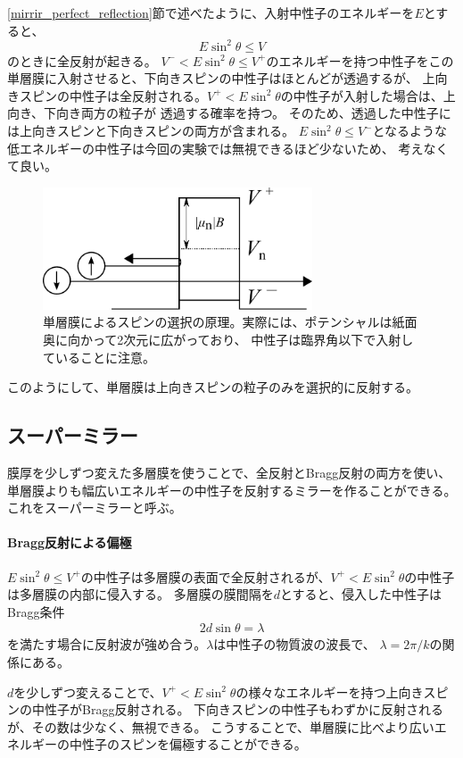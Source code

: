 \ref{mirrir_perfect_reflection}節で述べたように、入射中性子のエネルギーを$E$とすると、
\[
E\sin^2\theta\leq V
\]
のときに全反射が起きる。
$V^-< E\sin^2\theta\leq V^+$のエネルギーを持つ中性子をこの単層膜に入射させると、下向きスピンの中性子はほとんどが透過するが、
上向きスピンの中性子は全反射される。$V^+<E\sin^2\theta$の中性子が入射した場合は、上向き、下向き両方の粒子が
透過する確率を持つ。
そのため、透過した中性子には上向きスピンと下向きスピンの両方が含まれる。
$E\sin^2\theta\leq V^-$となるような低エネルギーの中性子は今回の実験では無視できるほど少ないため、
考えなくて良い。
\begin{figure}[h]
\centering
\includegraphics[width=8cm]{mirror/mono_mirror.pdf}
\caption{単層膜によるスピンの選択の原理。実際には、ポテンシャルは紙面奥に向かって2次元に広がっており、
中性子は臨界角以下で入射していることに注意。}
\end{figure}
このようにして、単層膜は上向きスピンの粒子のみを選択的に反射する。


\subsection{スーパーミラー}
膜厚を少しずつ変えた多層膜を使うことで、全反射とBragg反射の両方を使い、
単層膜よりも幅広いエネルギーの中性子を反射するミラーを作ることができる。
これをスーパーミラーと呼ぶ。

\paragraph{Bragg反射による偏極}
$E\sin^2\theta\leq V^+$の中性子は多層膜の表面で全反射されるが、$V^+<E\sin^2\theta$の中性子は多層膜の内部に侵入する。
多層膜の膜間隔を$d$とすると、侵入した中性子はBragg条件
\begin{align}
2d\sin\theta=\lambda
\end{align}
を満たす場合に反射波が強め合う。$\lambda$は中性子の物質波の波長で、
$\lambda=2\pi/k$の関係にある。

$d$を少しずつ変えることで、$V^+<E\sin^2\theta$の様々なエネルギーを持つ上向きスピンの中性子がBragg反射される。
下向きスピンの中性子もわずかに反射されるが、その数は少なく、無視できる。
こうすることで、単層膜に比べより広いエネルギーの中性子のスピンを偏極することができる。

